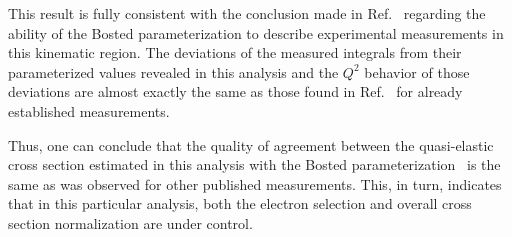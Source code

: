 This result is fully consistent with the conclusion made in Ref.~\cite{note_QE_peak} regarding the ability of the Bosted parameterization to describe experimental measurements in this kinematic region. The deviations of the measured integrals from their parameterized values revealed in this analysis and the $Q^{2}$ behavior of those deviations are almost exactly the same as those found in Ref.~\cite{note_QE_peak} for already established measurements.


Thus, one can conclude that the quality of agreement between the quasi-elastic cross section estimated in this analysis  with the Bosted parameterization~\cite{Bosted_fit,Bosted:2007xd} is the same as was observed for other published measurements. This, in turn, indicates that in this particular analysis, both the electron selection and overall cross section normalization are under control.

